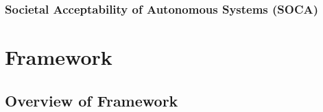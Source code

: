 \documentclass[lettersize,journal]{IEEEtran}
\begin{document}
\subsubsection{Societal Acceptability of Autonomous Systems (SOCA)}
\cite{Porter2022,McDermid2021}

\section{Framework}\label{framework}

\subsection{Overview of Framework} \label{framework-overview}
%
%
\vspace{2mm}

\end{document}
